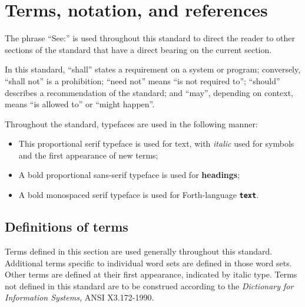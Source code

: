 
\chapter{Terms, notation, and references}

The phrase ``See:'' is used throughout this standard to direct the
reader to other sections of the standard that have a direct bearing
on the current section.

In this standard, ``shall'' states a requirement on a system or
program; conversely, ``shall not'' is a prohibition; ``need not''
means ``is not required to''; ``should'' describes a recommendation
of the standard; and ``may'', depending on context, means ``is allowed
to'' or ``might happen''.

Throughout the standard, typefaces are used in the following manner:
\begin{itemize}
\item This proportional serif typeface is used for text, with
	\textit{italic} used for symbols and the first appearance of new
	terms;
\item A bold proportional sans-serif typeface is used for
	\textbf{headings};
\item A bold monospaced serif typeface is used for Forth-language
	\textbf{\texttt{text}}.
\end{itemize}

\section{Definitions of terms}
\label{notation:terms}

Terms defined in this section are used generally throughout this
standard. Additional terms specific to individual word sets are
defined in those word sets. Other terms are defined at their first
appearance, indicated by italic type. Terms not defined in this
standard are to be construed according to the \emph{Dictionary for
Information Systems,} ANSI X3.172-1990.

